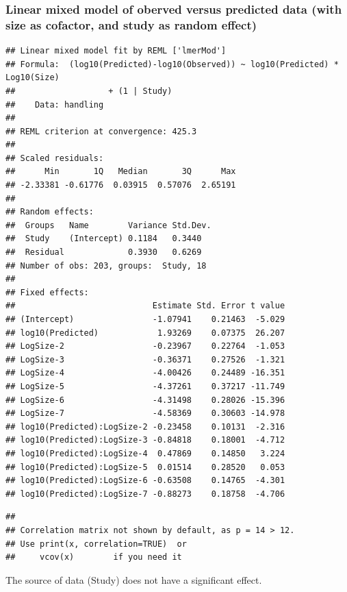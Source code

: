 \documentclass[utf8, 12 pt]{frontiers_suppmat}
\begin{document}
\hypertarget{linear-mixed-model-of-oberved-versus-predicted-data-with-size-as-cofactor-and-study-as-random-effect-1}{%
\subsubsection{Linear mixed model of oberved versus predicted data (with
size as cofactor, and study as random
effect)}\label{linear-mixed-model-of-oberved-versus-predicted-data-with-size-as-cofactor-and-study-as-random-effect-1}}

\begin{verbatim}
## Linear mixed model fit by REML ['lmerMod']
## Formula:  (log10(Predicted)-log10(Observed)) ~ log10(Predicted) * Log10(Size)
##                   + (1 | Study)
##    Data: handling
## 
## REML criterion at convergence: 425.3
## 
## Scaled residuals: 
##      Min       1Q   Median       3Q      Max 
## -2.33381 -0.61776  0.03915  0.57076  2.65191 
## 
## Random effects:
##  Groups   Name        Variance Std.Dev.
##  Study    (Intercept) 0.1184   0.3440  
##  Residual             0.3930   0.6269  
## Number of obs: 203, groups:  Study, 18
## 
## Fixed effects:
##                            Estimate Std. Error t value
## (Intercept)                -1.07941    0.21463  -5.029
## log10(Predicted)            1.93269    0.07375  26.207
## LogSize-2                  -0.23967    0.22764  -1.053
## LogSize-3                  -0.36371    0.27526  -1.321
## LogSize-4                  -4.00426    0.24489 -16.351
## LogSize-5                  -4.37261    0.37217 -11.749
## LogSize-6                  -4.31498    0.28026 -15.396
## LogSize-7                  -4.58369    0.30603 -14.978
## log10(Predicted):LogSize-2 -0.23458    0.10131  -2.316
## log10(Predicted):LogSize-3 -0.84818    0.18001  -4.712
## log10(Predicted):LogSize-4  0.47869    0.14850   3.224
## log10(Predicted):LogSize-5  0.01514    0.28520   0.053
## log10(Predicted):LogSize-6 -0.63508    0.14765  -4.301
## log10(Predicted):LogSize-7 -0.88273    0.18758  -4.706
\end{verbatim}

\begin{verbatim}
## 
## Correlation matrix not shown by default, as p = 14 > 12.
## Use print(x, correlation=TRUE)  or
##     vcov(x)        if you need it
\end{verbatim}
The source of data (Study) does not have a significant effect.
\end{document}
